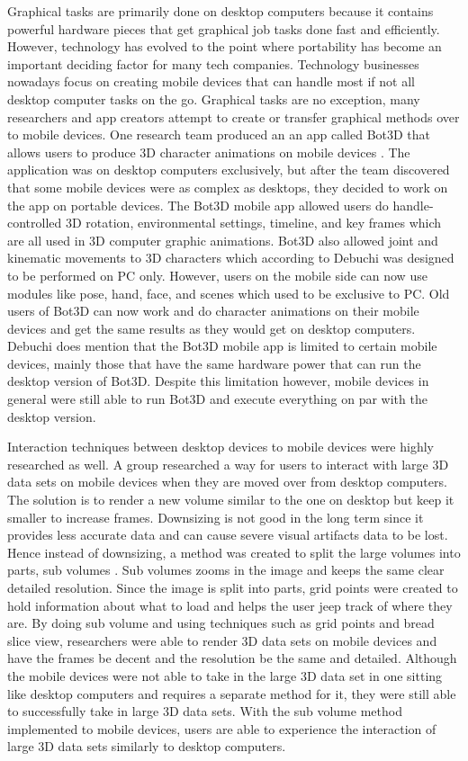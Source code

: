 \documentclass{article}
\begin{document}
    Graphical tasks are primarily done on desktop computers because it contains powerful hardware pieces that get graphical job tasks done fast and efficiently. However, technology has evolved to the point where portability has become an important deciding factor for many tech companies. Technology businesses nowadays focus on creating mobile devices that can handle most if not all desktop computer tasks on the go. Graphical tasks are no exception, many researchers and app creators attempt to create or transfer graphical methods over to mobile devices. One research team produced an an app called Bot3D that allows users to produce 3D character animations on mobile devices \cite{10.1145/3132787.3132807}. The application was on desktop computers exclusively, but after the team discovered that some mobile devices were as complex as desktops, they decided to work on the app on portable devices. The Bot3D mobile app allowed users do handle-controlled 3D rotation, environmental settings, timeline, and key frames which are all used in 3D computer graphic animations. Bot3D also allowed joint and kinematic movements to 3D characters which according to Debuchi was designed to be performed on PC only. However, users on the mobile side can now use modules like pose, hand, face, and scenes which used to be exclusive to PC. Old users of Bot3D can now work and do character animations on their mobile devices and get the same results as they would get on desktop computers. Debuchi does mention that the Bot3D mobile app is limited to certain mobile devices, mainly those that have the same hardware power that can run the desktop version of Bot3D. Despite this limitation however, mobile devices in general were still able to run Bot3D and execute everything on par with the desktop version. 
  
    Interaction techniques between desktop devices to mobile devices were highly researched as well.  A group researched a way for users to interact with large 3D data sets on mobile devices when they are moved over from desktop computers. The solution is to render a new volume similar to the one on desktop but keep it smaller to increase frames. Downsizing is not good in the long term since it provides less accurate data and can cause severe visual artifacts data to be lost. Hence instead of downsizing, a method was created to split the large volumes into parts, sub volumes \cite{7579401}. Sub volumes zooms in the image and keeps the same clear detailed resolution. Since the image is split into parts, grid points were created to hold information about what to load and helps the user jeep track of where they are. By doing sub volume and using techniques such as grid points and bread slice view, researchers were able to render 3D data sets on mobile devices and have the frames be decent and the resolution be the same and detailed. Although the mobile devices were not able to take in the large 3D data set in one sitting like desktop computers and requires a separate method for it, they were still able to successfully take in large 3D data sets. With the sub volume method implemented to mobile devices, users are able to experience the interaction of large 3D data sets similarly to desktop computers. 
\end{document}
